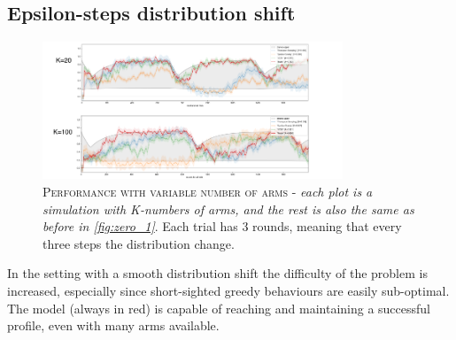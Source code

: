 \subsection{Epsilon-steps distribution shift}

\begin{figure}[ht]
    \centering
    \includegraphics[width=0.8\textwidth]{figures/drawing2.png}
    \caption{\textsc{Performance with variable number of arms} - \textit{each plot is a simulation with K-numbers of arms, and the rest is also the same as before in \ref{fig:zero_1}}. Each trial has 3 rounds, meaning that every three steps the distribution change.}
    \label{fig:eps_1}
\end{figure}

\noindent In the setting with a smooth distribution shift the difficulty of the problem is increased, especially since short-sighted greedy behaviours are easily sub-optimal. The model (always in red) is capable of reaching and maintaining a successful profile, even with many arms available.

